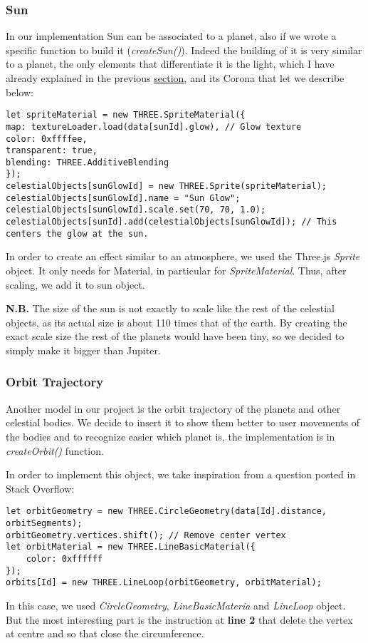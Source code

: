 \documentclass{article}
\begin{document}
\subsubsection{Sun}
In our implementation Sun can be associated to a planet, also if we wrote a specific function to build it (\textit{createSun()}). Indeed the building of it is very similar to a planet, the only elements that differentiate it is the light, which I have already explained in the previous \hyperref[subsec:pointlight]{section}, and its Corona that let we describe below:
\begin{lstlisting}
let spriteMaterial = new THREE.SpriteMaterial({
map: textureLoader.load(data[sunId].glow), // Glow texture
color: 0xffffee,
transparent: true,
blending: THREE.AdditiveBlending
});
celestialObjects[sunGlowId] = new THREE.Sprite(spriteMaterial);
celestialObjects[sunGlowId].name = "Sun Glow";
celestialObjects[sunGlowId].scale.set(70, 70, 1.0);
celestialObjects[sunId].add(celestialObjects[sunGlowId]); // This centers the glow at the sun.
\end{lstlisting}
In order to create an effect similar to an atmosphere, we used the Three.js \textit{Sprite}\cite{documentation:threejs} object. It only needs for Material, in particular for \textit{SpriteMaterial}\cite{documentation:threejs}. Thus, after scaling, we add it to sun object.
\par \textbf{N.B.} The size of the sun is not exactly to scale like the rest of the celestial objects, as its actual size is about 110 times that of the earth. By creating the exact scale size the rest of the planets would have been tiny, so we decided to simply make it bigger than Jupiter.

\subsubsection{Orbit Trajectory}
Another model in our project is the orbit trajectory of the planets and other celestial bodies. We decide to insert it to show them better to user movements of the bodies and to recognize easier which planet is, the implementation is in \textit{createOrbit()} function. 
\par In order to implement this object, we take inspiration from a question posted in Stack Overflow\cite{trajectory:stackoverflow}:
\begin{lstlisting}
let orbitGeometry = new THREE.CircleGeometry(data[Id].distance, orbitSegments);
orbitGeometry.vertices.shift(); // Remove center vertex
let orbitMaterial = new THREE.LineBasicMaterial({
	color: 0xffffff
});
orbits[Id] = new THREE.LineLoop(orbitGeometry, orbitMaterial);
\end{lstlisting}
In this case, we used \textit{CircleGeometry}\cite{documentation:threejs}, \textit{LineBasicMateria}\cite{documentation:threejs} and \textit{LineLoop}\cite{documentation:threejs} object. But the most interesting part is the instruction at \textbf{line 2} that delete the vertex at centre and so that close the circumference.
\end{document}
